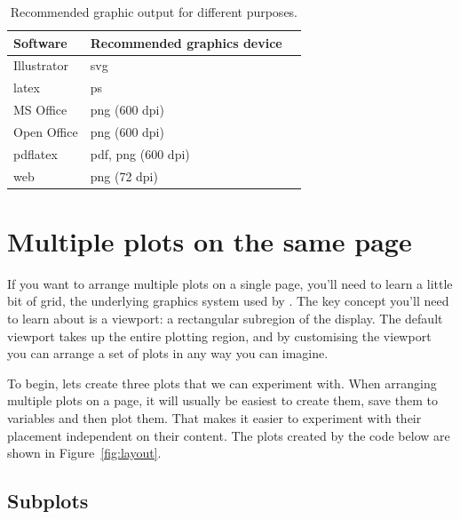 \begin{table}
  \begin{center}
  \begin{tabular}{lll}
    \toprule
    Software & Recommended graphics device \\
    \midrule
    Illustrator & svg \\
    latex & ps \\
    MS Office & png (600 dpi) \\
    Open Office & png (600 dpi) \\
    pdflatex & pdf, png (600 dpi) \\
    web & png (72 dpi) \\
    \bottomrule 
  \end{tabular}
  \end{center}
  \caption{Recommended graphic output for different purposes.}
  \label{tbl:graphic-recommendation}
\end{table}

\section{Multiple plots on the same page}
\label{sec:grid-layout}

If you want to arrange multiple plots on a single page, you'll need to learn a little bit of grid, the underlying graphics system used by \ggplot.  The key concept you'll need to learn about is a viewport: a rectangular subregion of the display.  The default viewport takes up the entire plotting region, and by customising the viewport you can arrange a set of plots in any way you can imagine.

To begin, lets create three plots that we can experiment with.  When arranging multiple plots on a page, it will usually be easiest to create them, save them to variables and then plot them.  That makes it easier to experiment with their placement independent on their content.  The plots created by the code below are shown in Figure~\ref{fig:layout}.

% 

\subsection{Subplots}

